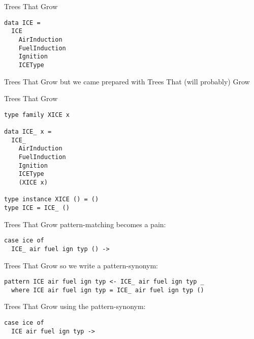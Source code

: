 \begin{frame}[fragile]
\begin{block}{Trees That Grow}
\begin{lstlisting}[style=haskell]
data ICE =
  ICE
    AirInduction
    FuelInduction
    Ignition
    ICEType
\end{lstlisting}
\end{block}
\end{frame}

\begin{frame}[fragile]
\begin{block}{Trees That Grow}
but we came prepared with Trees That (will probably) Grow
\end{block}
\end{frame}

\begin{frame}[fragile]
\begin{block}{Trees That Grow}
\begin{lstlisting}[style=haskell]
type family XICE x

data ICE_ x =
  ICE_
    AirInduction
    FuelInduction
    Ignition
    ICEType
    (XICE x)

type instance XICE () = ()
type ICE = ICE_ ()
\end{lstlisting}
\end{block}
\end{frame}

\begin{frame}[fragile]
\begin{block}{Trees That Grow}
pattern-matching becomes a pain:
\begin{lstlisting}[style=haskell]
case ice of
  ICE_ air fuel ign typ () -> 
\end{lstlisting}
\end{block}
\end{frame}

\begin{frame}[fragile]
\begin{block}{Trees That Grow}
so we write a pattern-synonym:
\begin{lstlisting}[style=haskell]
pattern ICE air fuel ign typ <- ICE_ air fuel ign typ _
  where ICE air fuel ign typ = ICE_ air fuel ign typ ()
\end{lstlisting}
\end{block}
\end{frame}
 
\begin{frame}[fragile]
\begin{block}{Trees That Grow}
using the pattern-synonym:
\begin{lstlisting}[style=haskell]
case ice of
  ICE air fuel ign typ -> 
\end{lstlisting}
\end{block}
\end{frame}
 
